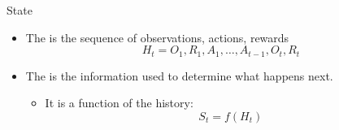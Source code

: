 \bgroup
\begin{frame}{State}
\begin{itemize}
\item The  is the sequence of observations, actions, rewards
\begin{equation*}
H_t = O_1, R_1, A_1, \ldots, A_{t-1}, O_t, R_t
\end{equation*}
\item The  is the information used to determine what happens next.
\begin{itemize}
\item It is a function of the history:
\begin{equation*}
S_t = f(H_t)
\end{equation*}
\end{itemize}
\end{itemize}
\end{frame}
\egroup